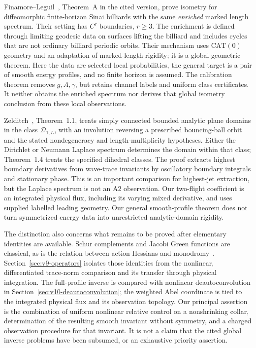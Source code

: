 Finamore--Leguil~\cite{FinamoreLeguil}, Theorem~A in the cited version,
prove isometry for diffeomorphic finite-horizon Sinai billiards with
the same \emph{enriched} marked length spectrum. Their setting has
$C^r$ boundaries, $r\ge3$. The enrichment is defined through limiting
geodesic data on surfaces lifting the billiard and includes cycles
that are not ordinary billiard periodic orbits. Their mechanism uses
$\mathrm{CAT}(0)$ geometry and an adaptation of marked-length rigidity;
it is a global geometric theorem. Here the data are selected local
probabilities, the general target is a pair of smooth energy profiles,
and no finite horizon is assumed. The calibration theorem removes
$g,A,\gamma$, but retains channel labels and uniform class certificates.
It neither obtains the enriched spectrum nor derives that global
isometry conclusion from these local observations.

Zelditch~\cite{Zelditch}, Theorem~1.1, treats simply connected bounded
analytic plane domains in the class $\mathcal D_{1,L}$, with an
involution reversing a prescribed bouncing-ball orbit and the stated
nondegeneracy and length-multiplicity hypotheses. Either the Dirichlet
or Neumann Laplace spectrum determines the domain within that class;
Theorem~1.4 treats the specified dihedral classes. The proof extracts
highest boundary derivatives from wave-trace invariants by oscillatory
boundary integrals and stationary phase. This is an important comparison
for highest-jet extraction, but the Laplace spectrum is not an A2
observation. Our two-flight coefficient is an integrated physical flux,
including its varying mixed derivative, and uses supplied labelled
leading geometry. Our general smooth-profile theorem does not turn
symmetrized energy data into unrestricted analytic-domain rigidity.

The distinction also concerns what remains to be proved after elementary
identities are available. Schur complements and Jacobi Green functions
are classical, as is the relation between action Hessians and
monodromy~\cite{Hill}. Section~\ref{sec:v9-operators} isolates those
identities from the nonlinear, differentiated trace-norm comparison
and its transfer through physical integration. The full-profile inverse
is compared with nonlinear deautoconvolution in
Section~\ref{sec:v10-deautoconvolution}; the weighted Abel coordinate
is tied to the integrated physical flux and its observation topology.
Our principal assertion is the combination of uniform nonlinear relative
control on a nonshrinking collar, determination of the resulting
smooth invariant without symmetry, and a charged observation procedure
for that invariant. It is not a claim that the cited global inverse
problems have been subsumed, or an exhaustive priority assertion.

